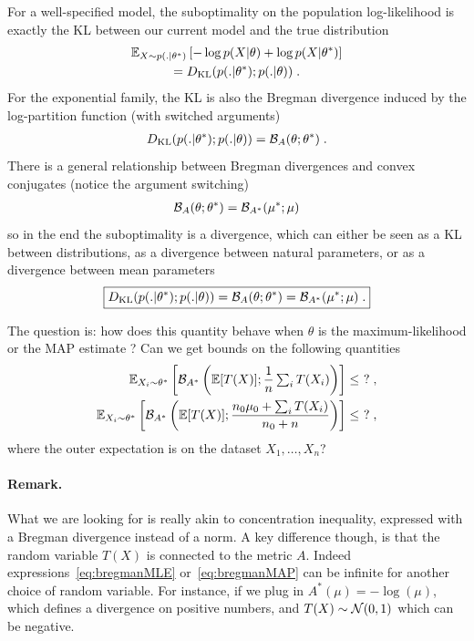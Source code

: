 \documentclass[twoside]{article}
\newcommand*{\expect}[2][]{\ensuremath{\mathbb{E}_{#1} \left[ #2 \right] }} %
\newcommand{\logpart}{A}
\newcommand{\conj}{\logpart^*}
\newcommand{\bregman}{\cB_\logpart}
\newcommand{\bregmanconj}{\cB_{\logpart^*}}
\newcommand{\natp}{\theta}
\newcommand{\meanp}{\mu}
\begin{document}
For a well-specified model, the suboptimality on the population log-likelihood is exactly the KL between our current model and the true distribution
\begin{multline}
    \expect[X\sim p(.|\natp^*)]{-\log p(X|\natp) + \log p(X|\natp^*) } \\
	= \KL( p(.|\natp^*) ; p(.|\natp)) \; .
\end{multline}
For the exponential family, the KL is also the Bregman divergence induced by the log-partition function (with switched arguments)
\begin{align}
	\KL( p(.|\natp^*) ; p(.|\natp)) 
	= \bregman (\natp ; \natp^*)  \; .
\end{align}
There is a general relationship between Bregman divergences and convex conjugates (notice the argument switching)
\begin{align}
	\bregman (\natp ; \natp^*)
    = \bregmanconj ( \meanp^* ; \meanp)
\end{align}
so in the end the suboptimality is a divergence, which can either be seen as a KL between distributions, as a divergence between natural parameters, or as a divergence between mean parameters
\begin{align}
\boxed{
	\KL( p(.|\natp^*) ; p(.|\natp))
    = \bregman (\natp ; \natp^*)
    = \bregmanconj ( \meanp^* ; \meanp) \; .
}
\end{align}

The question is: how does this quantity behave when $\natp$ is the maximum-likelihood or the MAP estimate ? Can we get bounds on the following quantities
\begin{align}
	\label{eq:bregmanMLE}
	\expect[X_i\sim \natp^*]{\bregmanconj \left (\E [T(X)] ;  \inv{n}  \smallsum_i T(X_i) \right )} \leq \ ? \; , \\
	\label{eq:bregmanMAP}
	\expect[X_i\sim \natp^*]{\bregmanconj \left (\E [T(X)] ; \frac{n_0 \mu_0 + \smallsum_i T(X_i)}{n_0+n} \right )} \leq \ ? \; ,
\end{align}
where the outer expectation is on the dataset $X_1, \dots, X_n$?


\paragraph{Remark.}
What we are looking for is really akin to concentration inequality, expressed with a Bregman divergence instead of a norm. A key difference though, is that the random variable $T(X)$ is connected to the metric $\logpart$. Indeed expressions~\eqref{eq:bregmanMLE} or~\eqref{eq:bregmanMAP} can be infinite for another choice of random variable. For instance, if we plug in $\conj(\mu)= -\log(\mu)$, which defines a divergence on positive numbers, and $T(X) \sim {\mathcal N}(0,1)$ which can be negative.
\end{document}
